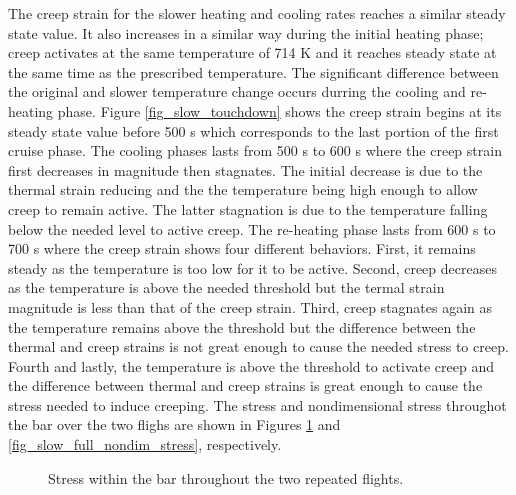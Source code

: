 \documentclass[conf]{new-aiaa}
\begin{document}
The creep strain for the slower heating and cooling rates 
reaches a similar steady state value.
It also increases in a similar way during the initial 
heating phase;
creep activates at the same temperature of 714 K and
it reaches steady state at the same time as the prescribed temperature.
The significant difference between the original and slower temperature
change occurs durring the cooling and re-heating phase.
Figure \ref{fig_slow_touchdown} shows the creep strain
begins at its steady state value before 500 s
which corresponds to the last portion of the first cruise phase.
The cooling phases lasts from 500 s to 600 s where
the creep strain first decreases in magnitude then stagnates.
The initial decrease is due to the thermal strain reducing and
the the temperature being high enough to allow creep to remain active.
The latter stagnation is due to the temperature falling below
the needed level to active creep. 
The re-heating phase lasts from 600 s to 700 s where the
creep strain shows four different behaviors.
First, it remains steady as the temperature is too low for it to be active.
Second, creep decreases as the temperature is above the needed threshold
but the termal strain magnitude is less than that of the creep strain.
Third, creep stagnates again as the temperature remains 
above the threshold but the difference
between the thermal and creep strains is not great enough to cause
the needed stress to creep. 
Fourth and lastly, the temperature is above the threshold to activate 
creep and the difference between thermal and creep strains is 
great enough to cause the stress needed to induce creeping.
The stress and nondimensional stress throughot the bar
over the two flighs are shown in Figures 
\ref{fig_slow_full_bar_stress} and
\ref{fig_slow_full_nondim_stress}, respectively.

\begin{figure}[H]
  \centering
  \caption{ Stress within the bar throughout the two repeated flights.}
  \label{fig_slow_full_bar_stress}
\end{figure}
\end{document}
